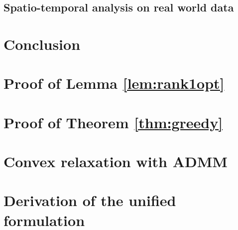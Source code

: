\documentclass{article} %
\begin{document}
\subsection{Spatio-temporal analysis on real world data}


%

%

\vspace{-0.1in}
\section{Conclusion}
\vspace{-0.1in}

\vspace{-0.1in}




\newpage
%

\appendix
%

\section{Proof of Lemma \ref{lem:rank1opt}}
\label{sec:optRank1}


\section{Proof of Theorem \ref{thm:greedy}}
\label{sec:gProof}


\section{Convex relaxation with ADMM}
\label{sec:admm_algo}


\section{Derivation of the unified formulation}
\label{sec:derive}

\end{document}
